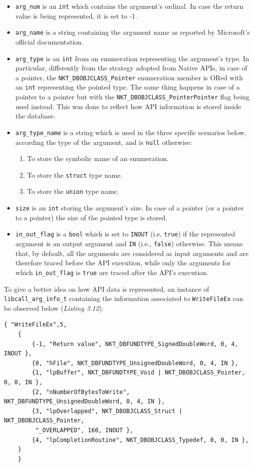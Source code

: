 \begin{itemize}
\item \texttt{arg\_num} is an \texttt{int} which contains the argument's ordinal. In case the return value is being represented, it is set to -1.
\item \texttt{arg\_name} is a string containing the argument name as reported by Microsoft's official documentation.
\item \texttt{arg\_type} is an \texttt{int} from an enumeration representing the argument's type. In particular, differently from the strategy adopted from Native APIs, in case of a pointer, the \texttt{NKT\_DBOBJCLASS\_Pointer} enumeration member is ORed with an \texttt{int} representing the pointed type. The same thing happens in case of a pointer to a pointer but with the \texttt{NKT\_DBOBJCLASS\_PointerPointer} flag being used instead. This was done to reflect how API information is stored inside the database.
\item \texttt{arg\_type\_name} is a string which is used in the three specific scenarios below, according the type of the argument, and is \texttt{null} otherwise:
\begin{enumerate}
\item To store the symbolic name of an enumeration.
\item To store the \texttt{struct} type name.
\item To store the \texttt{union} type name.
\end{enumerate}
\item \texttt{size} is an \texttt{int} storing the argument's size. In case of a pointer (or a pointer to a pointer) the size of the pointed type is stored.
\item \texttt{in\_out\_flag} is a \texttt{bool} which is set to \texttt{INOUT} (i.e, \texttt{true}) if the represented argument is an output argument and \texttt{IN} (i.e., \texttt{false}) otherwise. This means that, by default, all the arguments are considered as input arguments and are therefore traced before the API execution, while only the arguments for which \texttt{in\_out\_flag} is \texttt{true} are traced after the API's execution.
\end{itemize}

To give a better idea on how API data is represented, an instance of \texttt{libcall\_arg\_info\_t} containing the information associated to \texttt{WriteFileEx} can be observed below (\textit{Listing 3.12}).
\\
\begin{lstlisting}[caption={Instance of \texttt{libcall\_arg\_info\_t} relative to \texttt{WriteFileEx}},captionpos=b]
	{ "WriteFileEx",5,
	{ 
		{-1, "Return value", NKT_DBFUNDTYPE_SignedDoubleWord, 0, 4, INOUT },
		{0, "hFile", NKT_DBFUNDTYPE_UnsignedDoubleWord, 0, 4, IN },
		{1, "lpBuffer", NKT_DBFUNDTYPE_Void | NKT_DBOBJCLASS_Pointer, 0, 0, IN },
		{2, "nNumberOfBytesToWrite", NKT_DBFUNDTYPE_UnsignedDoubleWord, 0, 4, IN },
		{3, "lpOverlapped", NKT_DBOBJCLASS_Struct | NKT_DBOBJCLASS_Pointer,
		 "_OVERLAPPED", 160, INOUT },
		{4, "lpCompletionRoutine", NKT_DBOBJCLASS_Typedef, 0, 0, IN },
	}
	}
\end{lstlisting}


